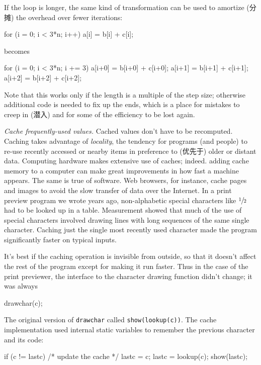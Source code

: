 If the loop is longer, the same kind of transformation can be used to
amortize (分摊) the overhead over fewer iterations:
\begin{wellcode}
    for (i = 0; i < 3*n; i++)
        a[i] = b[i] + c[i];
\end{wellcode}
becomes
\begin{wellcode}
    for (i = 0; i < 3*n; i += 3) {
        a[i+0] = b[i+0] + c[i+0];
        a[i+1] = b[i+1] + c[i+1];
        a[i+2] = b[i+2] + c[i+2];
    }
\end{wellcode}
Note that this works only if the length is a multiple of the step size;
otherwise additional code is needed to fix up the ends, which is a place
for mistakes to creep in (潜入) and for some of the efficiency to be lost
again.

\emph{Cache frequently-used values.} Cached values don't have to be
recomputed.  Caching takes advantage of \textit{locality}, the tendency for
programs (and people) to re-use recently accessed or nearby items in
preference to (优先于) older or distant data. Computing hardware makes
extensive use of caches; indeed. adding cache memory to a computer can make
great improvements in how fast a machine appears. The same is true of
software.  Web browsers, for instance, cache pages and images to avoid the
slow transfer of data over the Internet. In a print preview program we
wrote years ago, non-alphabetic special characters like $\sfrac{1}{2}$ had
to be looked up in a table. Measurement showed that much of the use of
special characters involved drawing lines with long sequences of the same
single character. Caching just the single most recently used character made
the program significantly faster on typical inputs.

It's best if the caching operation is invisible from outside, so that it
doesn't affect the rest of the program except for making it run faster.
Thus in the case of the print previewer, the interface to the character
drawing function didn't change; it was always
\begin{wellcode}
    drawchar(c);
\end{wellcode}
The original version of \verb'drawchar' called \verb'show(lookup(c))'. The
cache implementation used internal static variables to remember the
previous character and its code:
\begin{wellcode}
    if (c != lastc) { /* update the cache */
        lastc = c;
        lastc = lookup(c);
    }
    show(lastc);
\end{wellcode}

